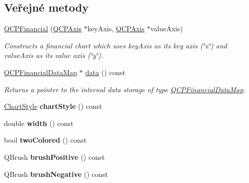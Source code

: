 \subsection*{Veřejné metody}
\begin{DoxyCompactItemize}
\item 
\hyperlink{classQCPFinancial_a4702d5248feeb9d1ec6e3ce725b10b32}{Q\+C\+P\+Financial} (\hyperlink{classQCPAxis}{Q\+C\+P\+Axis} $\ast$key\+Axis, \hyperlink{classQCPAxis}{Q\+C\+P\+Axis} $\ast$value\+Axis)
\begin{DoxyCompactList}\small\item\em Constructs a financial chart which uses {\itshape key\+Axis} as its key axis (\char`\"{}x\char`\"{}) and {\itshape value\+Axis} as its value axis (\char`\"{}y\char`\"{}). \end{DoxyCompactList}\item 
\hyperlink{qcustomplot_8h_a745c09823fae0974b50beca9bc3b3d7d}{Q\+C\+P\+Financial\+Data\+Map} $\ast$ \hyperlink{classQCPFinancial_a58e05aefa057d16edfcc0334cf81c241}{data} () const 
\begin{DoxyCompactList}\small\item\em Returns a pointer to the internal data storage of type \hyperlink{qcustomplot_8h_a745c09823fae0974b50beca9bc3b3d7d}{Q\+C\+P\+Financial\+Data\+Map}. \end{DoxyCompactList}\item 
\hypertarget{classQCPFinancial_a0888c9308cc5fcb4daa70184f9582412}{}\hyperlink{classQCPFinancial_a0f800e21ee98d646dfc6f8f89d10ebfb}{Chart\+Style} {\bfseries chart\+Style} () const \label{classQCPFinancial_a0888c9308cc5fcb4daa70184f9582412}

\item 
\hypertarget{classQCPFinancial_a71ccaa04cdade0ec08a2117db6e4a4ce}{}double {\bfseries width} () const \label{classQCPFinancial_a71ccaa04cdade0ec08a2117db6e4a4ce}

\item 
\hypertarget{classQCPFinancial_a2bab30fc4eee38a0da3a05846b8d7ac7}{}bool {\bfseries two\+Colored} () const \label{classQCPFinancial_a2bab30fc4eee38a0da3a05846b8d7ac7}

\item 
\hypertarget{classQCPFinancial_acb69536a334fae7fc31b2bfd4eca81f5}{}Q\+Brush {\bfseries brush\+Positive} () const \label{classQCPFinancial_acb69536a334fae7fc31b2bfd4eca81f5}

\item 
\hypertarget{classQCPFinancial_a91e09b31ce341c17b917e77fdc68d84e}{}Q\+Brush {\bfseries brush\+Negative} () const \label{classQCPFinancial_a91e09b31ce341c17b917e77fdc68d84e}


\end{DoxyCompactItemize}
